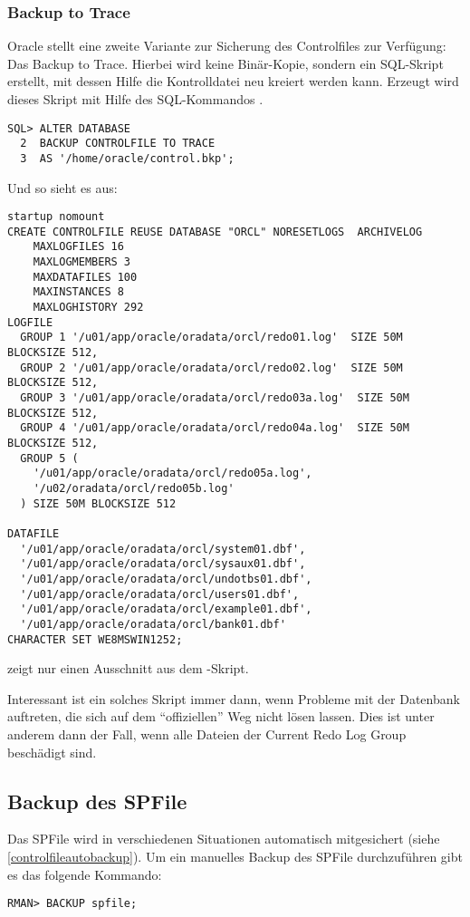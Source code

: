         \subsubsection{Backup to Trace}
          Oracle stellt eine zweite Variante zur Sicherung des Controlfiles zur Verfügung: Das Backup to Trace. Hierbei wird keine Binär-Kopie, sondern ein SQL-Skript erstellt, mit dessen Hilfe die Kontrolldatei neu kreiert werden kann. Erzeugt wird dieses Skript mit Hilfe des SQL-Kommandos .
        \begin{lstlisting}[caption={Kontrolldatei in ein Backup mit einschließen},label=admin1324,language=oracle_sql]
SQL> ALTER DATABASE
  2  BACKUP CONTROLFILE TO TRACE
  3  AS '/home/oracle/control.bkp';
        \end{lstlisting}
        Und so sieht es aus:
        \begin{lstlisting}[caption={Das \languageorasql{CREATE CONTROLFILE}-Skript},label=admin1325,language=oracle_sql]
startup nomount
CREATE CONTROLFILE REUSE DATABASE "ORCL" NORESETLOGS  ARCHIVELOG
    MAXLOGFILES 16
    MAXLOGMEMBERS 3
    MAXDATAFILES 100
    MAXINSTANCES 8
    MAXLOGHISTORY 292
LOGFILE
  GROUP 1 '/u01/app/oracle/oradata/orcl/redo01.log'  SIZE 50M BLOCKSIZE 512,
  GROUP 2 '/u01/app/oracle/oradata/orcl/redo02.log'  SIZE 50M BLOCKSIZE 512,
  GROUP 3 '/u01/app/oracle/oradata/orcl/redo03a.log'  SIZE 50M BLOCKSIZE 512,
  GROUP 4 '/u01/app/oracle/oradata/orcl/redo04a.log'  SIZE 50M BLOCKSIZE 512,
  GROUP 5 (
    '/u01/app/oracle/oradata/orcl/redo05a.log',
    '/u02/oradata/orcl/redo05b.log'
  ) SIZE 50M BLOCKSIZE 512

DATAFILE
  '/u01/app/oracle/oradata/orcl/system01.dbf',
  '/u01/app/oracle/oradata/orcl/sysaux01.dbf',
  '/u01/app/oracle/oradata/orcl/undotbs01.dbf',
  '/u01/app/oracle/oradata/orcl/users01.dbf',
  '/u01/app/oracle/oradata/orcl/example01.dbf',
  '/u01/app/oracle/oradata/orcl/bank01.dbf'
CHARACTER SET WE8MSWIN1252;
          \end{lstlisting}
           zeigt nur einen Ausschnitt aus dem -Skript.

          Interessant ist ein solches Skript immer dann, wenn Probleme mit der Datenbank auftreten, die sich auf dem \enquote{offiziellen} Weg nicht lösen lassen. Dies ist unter anderem dann der Fall, wenn alle Dateien der Current Redo Log Group beschädigt sind.
      \subsection{Backup des SPFile}
        Das SPFile wird in verschiedenen Situationen automatisch mitgesichert (siehe \ref{controlfileautobackup}). Um ein manuelles Backup des SPFile durchzuführen gibt es das folgende Kommando:
        \begin{lstlisting}[caption={Manuelles Backup des SPFile},label=admin1326,language=rman]
RMAN> BACKUP spfile;
          \end{lstlisting}
